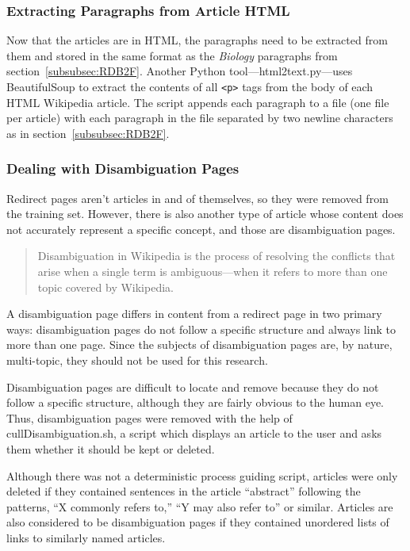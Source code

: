 \subsubsection{Extracting Paragraphs from Article HTML}
\label{sec:training-files}

Now that the articles are in HTML, the paragraphs need to be extracted from them and stored in the same format as the {\it Biology} paragraphs from section~\ref{subsubsec:RDB2F}.
Another Python tool---html2text.py---uses BeautifulSoup \cite{beautifulsoup} to extract the contents of all {\tt <p>} tags from the body of each HTML Wikipedia article.
The script appends each paragraph to a file (one file per article) with each paragraph in the file separated by two newline characters as in section~\ref{subsubsec:RDB2F}.

\subsubsection{Dealing with Disambiguation Pages}

Redirect pages aren't articles in and of themselves, so they were removed from the training set.
However, there is also another type of article whose content does not accurately represent a specific concept, and those are disambiguation pages.

\begin{quote}
Disambiguation in Wikipedia is the process of resolving the conflicts that arise when a single term is ambiguous---when it refers to more than one topic covered by Wikipedia. \cite{wiki-disambiguation}
\end{quote}

A disambiguation page differs in content from a redirect page in two primary ways: disambiguation pages do not follow a specific structure and always link to more than one page.
Since the subjects of disambiguation pages are, by nature, multi-topic, they should not be used for this research.

Disambiguation pages are difficult to locate and remove because they do not follow a specific structure, although they are fairly obvious to the human eye.
Thus, disambiguation pages were removed with the help of cullDisambiguation.sh, a script which displays an article to the user and asks them whether it should be kept or deleted.

Although there was not a deterministic process guiding script, articles were only deleted if they contained sentences in the article ``abstract'' following the patterns, ``X commonly refers to,'' ``Y may also refer to'' or similar. Articles are also considered to be disambiguation pages if they contained unordered lists of links to similarly named articles.

